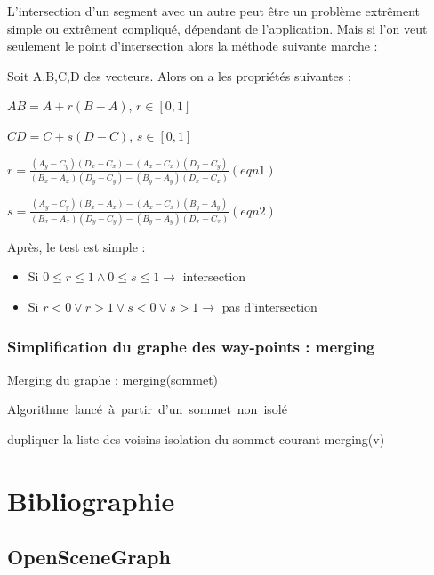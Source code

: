 \documentclass[a4paper,12pt]{report}
\begin{document}
L'intersection d'un segment avec un autre peut être un problème extrêment simple ou extrêment compliqué, dépendant de l'application. 
Mais si l'on veut seulement le point d'intersection alors la méthode suivante marche :

Soit A,B,C,D des vecteurs. Alors on a les propriétés suivantes :

$AB=A+r(B-A)$, $r \in [0,1]$

$CD=C+s(D-C)$, $s \in [0,1]$

$r = \frac{(A_{y}-C_{y})(D_{x}-C_{x})-(A_{x}-C_{x})(D_{y}-C_{y})}{(B_{x}-A_{x})(D_{y}-C_{y})-(B_{y}-A_{y})(D_{x}-C_{x})} (eqn 1)$

$s = \frac{(A_{y}-C_{y})(B_{x}-A_{x})-(A_{x}-C_{x})(B_{y}-A_{y})}{(B_{x}-A_{x})(D_{y}-C_{y})-(B_{y}-A_{y})(D_{x}-C_{x})} (eqn 2)$

Après, le test est simple : 
\begin{itemize}
 \item Si $0\le r \le 1 \wedge 0 \le s \le 1 \rightarrow$ intersection
 \item Si $r<0 \vee r>1 \vee s<0 \vee s>1 \rightarrow$ pas d'intersection
\end{itemize}

\subsection{Simplification du graphe des way-points : merging}

\begin{algorithm}[h]
\caption{Merging du graphe : merging(sommet)}
\label{merging_graphe}
\mbox{Algorithme lancé à partir d'un sommet non isolé}
\begin{algorithmic}[1]
  \STATE dupliquer la liste des voisins
      \STATE isolation du sommet courant
    \ENDIF
  \ENDIF
    \STATE merging(v)
  \ENDFOR
\ENDIF
\end{algorithmic}
\end{algorithm}

\chapter{Bibliographie}

\section*{OpenSceneGraph}
\end{document}
